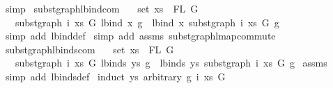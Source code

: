 \begin{isabellebody}
%
\isadelimproof
%
\endisadelimproof
%
\isatagproof
{}\isamarkupfalse%
\ simp%
\endisatagproof
{\isafoldproof}%
%
\isadelimproof
\isanewline
%
\endisadelimproof
\isanewline
\isanewline
{}\isamarkupfalse%
\ subst{\isacharunderscore}{\kern0pt}graph{\isacharunderscore}{\kern0pt}lbind{\isacharunderscore}{\kern0pt}com{\isacharcolon}{\kern0pt}\isanewline
\ \ \ {\isachardoublequoteopen}set\ xs\ {\isacharequal}{\kern0pt}\ FL\ G{\isachardoublequoteclose}\isanewline
\ \ \ {\isachardoublequoteopen}subst{\isacharunderscore}{\kern0pt}graph\ i\ xs\ G\ {\isacharparenleft}{\kern0pt}lbind\ x\ g{\isacharparenright}{\kern0pt}\ {\isacharequal}{\kern0pt}\ lbind\ x\ {\isacharparenleft}{\kern0pt}subst{\isacharunderscore}{\kern0pt}graph\ i\ xs\ G\ g{\isacharparenright}{\kern0pt}{\isachardoublequoteclose}\isanewline
%
\isadelimproof
%
\endisadelimproof
%
\isatagproof
{}\isamarkupfalse%
\ {\isacharparenleft}{\kern0pt}simp\ add{\isacharcolon}{\kern0pt}\ lbind{\isacharunderscore}{\kern0pt}def{\isacharparenright}{\kern0pt}\isanewline
{}\isamarkupfalse%
\ {\isacharparenleft}{\kern0pt}simp\ add{\isacharcolon}{\kern0pt}\ assms\ subst{\isacharunderscore}{\kern0pt}graph{\isacharunderscore}{\kern0pt}lmap{\isacharunderscore}{\kern0pt}commute{\isacharparenright}{\kern0pt}%
\endisatagproof
{\isafoldproof}%
%
\isadelimproof
\isanewline
%
\endisadelimproof
\isanewline
\isanewline
{}\isamarkupfalse%
\ subst{\isacharunderscore}{\kern0pt}graph{\isacharunderscore}{\kern0pt}lbinds{\isacharunderscore}{\kern0pt}com{\isacharcolon}{\kern0pt}\isanewline
\ \ \ {\isachardoublequoteopen}set\ xs\ {\isacharequal}{\kern0pt}\ FL\ G{\isachardoublequoteclose}\isanewline
\ \ \ {\isachardoublequoteopen}subst{\isacharunderscore}{\kern0pt}graph\ i\ xs\ G\ {\isacharparenleft}{\kern0pt}lbinds\ ys\ g{\isacharparenright}{\kern0pt}\ {\isacharequal}{\kern0pt}\ lbinds\ ys\ {\isacharparenleft}{\kern0pt}subst{\isacharunderscore}{\kern0pt}graph\ i\ xs\ G\ g{\isacharparenright}{\kern0pt}{\isachardoublequoteclose}\isanewline
%
\isadelimproof
%
\endisadelimproof
%
\isatagproof
{}\isamarkupfalse%
\ assms\isanewline
{}\isamarkupfalse%
\ {\isacharparenleft}{\kern0pt}simp\ add{\isacharcolon}{\kern0pt}\ lbinds{\isacharunderscore}{\kern0pt}def{\isacharparenright}{\kern0pt}\isanewline
{}\isamarkupfalse%
\ {\isacharparenleft}{\kern0pt}induct\ ys\ arbitrary{\isacharcolon}{\kern0pt}\ g\ i\ xs\ G{\isacharparenright}{\kern0pt}\isanewline

\end{isabellebody}
